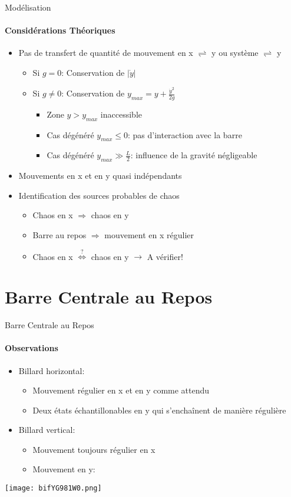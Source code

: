 \documentclass{beamer}
\begin{document}
  \begin{frame}{Modélisation}
  \framesubtitle{Considérations Théoriques}
  \begin{itemize}
    \item Pas de transfert de quantité de mouvement en x \(\rightleftharpoons\) y ou système \(\rightleftharpoons\) y
     \begin{itemize}
       \item Si \(g=0\): Conservation de \(\lvert \dot{y} \rvert\)
       \item Si \(g\neq0\): Conservation de \(y_{max}=y+\frac{\dot{y}^2}{2g}\)
       \begin{itemize}
         \item Zone \(y>y_{max}\) inaccessible
         \pause \item Cas dégénéré \(y_{max} \leq 0\): pas d'interaction avec la barre
         \item Cas dégénéré \(y_{max} \gg \frac{L}{2}\): influence de la gravité négligeable
       \end{itemize}
     \end{itemize}
    \pause \item Mouvements en x et en y quasi indépendants
    \item Identification des sources probables de chaos
    \begin{itemize}
      \pause \item Chaos en x \(\Rightarrow\) chaos en y
      \item Barre au repos \(\Rightarrow\) mouvement en x régulier
      \pause \item Chaos en x \(\overset{?}{\Leftrightarrow}\) chaos en y \(\rightarrow\) A vérifier!
    \end{itemize}
  \end{itemize}
  \end{frame}
  
  \section{Barre Centrale au Repos}
  
  \begin{frame}{Barre Centrale au Repos}
  \framesubtitle{Observations}
  \begin{itemize}
    \item Billard horizontal:
    \begin{itemize}
      \item Mouvement régulier en x et en y comme attendu
      \item Deux états échantillonables en y qui s'enchaînent de manière régulière
    \end{itemize}
    \pause \item Billard vertical:
    \begin{itemize}
      \item Mouvement toujours régulier en x
      \pause \item Mouvement en y:
    \end{itemize}
  \end{itemize}
  \texttt{[image: bifYG981W0.png]}
  \end{frame}
  
\end{document}
